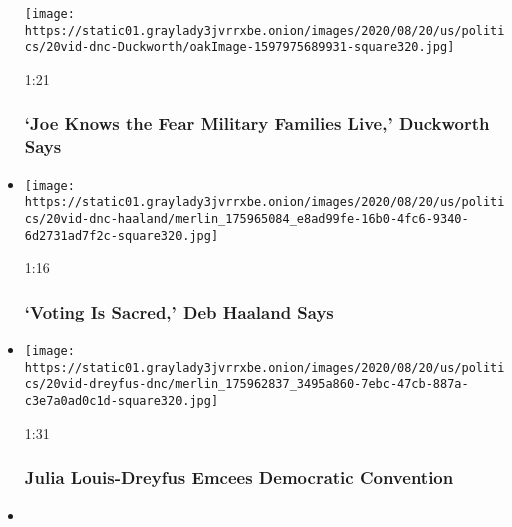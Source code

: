 \begin{itemize}
  \texttt{[image: https://static01.graylady3jvrrxbe.onion/images/2020/08/20/us/politics/20vid-dnc-Duckworth/oakImage-1597975689931-square320.jpg]}

  1:21

  \hypertarget{joe-knows-the-fear-military-families-live-duckworth-says}{%
  \subsubsection{`Joe Knows the Fear Military Families Live,' Duckworth
  Says}\label{joe-knows-the-fear-military-families-live-duckworth-says}}
\item
  \href{https://www.nytimes3xbfgragh.onion/video/us/elections/100000007299756/deb-haaland-speaks-dnc.html?action=click\&module=video-series-bar\&region=header\&pgtype=Article\&playlistId=video/2020-Elections}{}

  \texttt{[image: https://static01.graylady3jvrrxbe.onion/images/2020/08/20/us/politics/20vid-dnc-haaland/merlin\_175965084\_e8ad99fe-16b0-4fc6-9340-6d2731ad7f2c-square320.jpg]}

  1:16

  \hypertarget{voting-is-sacred-deb-haaland-says}{%
  \subsubsection{`Voting Is Sacred,' Deb Haaland
  Says}\label{voting-is-sacred-deb-haaland-says}}
\item
  \href{https://www.nytimes3xbfgragh.onion/video/us/elections/100000007299846/julia-louis-dreyfus-speaks-dnc.html?action=click\&module=video-series-bar\&region=header\&pgtype=Article\&playlistId=video/2020-Elections}{}

  \texttt{[image: https://static01.graylady3jvrrxbe.onion/images/2020/08/20/us/politics/20vid-dreyfus-dnc/merlin\_175962837\_3495a860-7ebc-47cb-887a-c3e7a0ad0c1d-square320.jpg]}

  1:31

  \hypertarget{julia-louis-dreyfus-emcees-democratic-convention}{%
  \subsubsection{Julia Louis-Dreyfus Emcees Democratic
  Convention}\label{julia-louis-dreyfus-emcees-democratic-convention}}
\item
  \href{https://www.nytimes3xbfgragh.onion/video/us/elections/100000007299826/keisha-lance-bottoms-speaks-dnc.html?action=click\&module=video-series-bar\&region=header\&pgtype=Article\&playlistId=video/2020-Elections}{}


\end{itemize}
